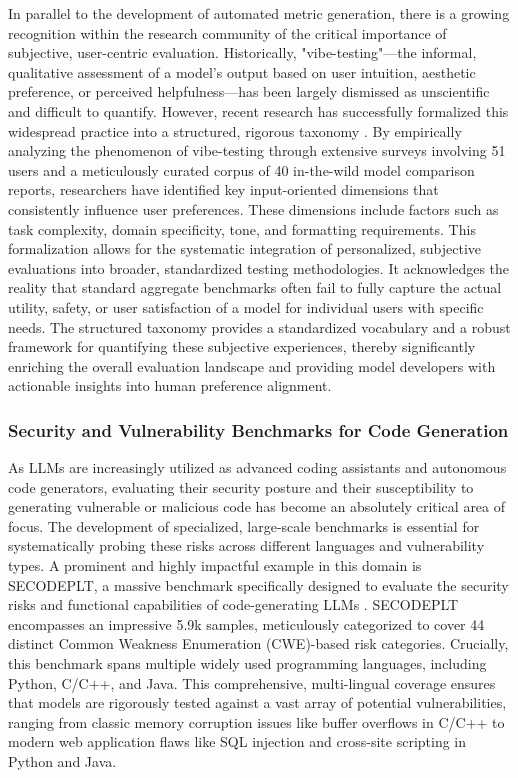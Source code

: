 \documentclass[11pt,a4paper]{article}
\begin{document}
In parallel to the development of automated metric generation, there is a growing recognition within the research community of the critical importance of subjective, user-centric evaluation. Historically, "vibe-testing"---the informal, qualitative assessment of a model's output based on user intuition, aesthetic preference, or perceived helpfulness---has been largely dismissed as unscientific and difficult to quantify. However, recent research has successfully formalized this widespread practice into a structured, rigorous taxonomy \cite{Itzhak_2026_LLMs}. By empirically analyzing the phenomenon of vibe-testing through extensive surveys involving 51 users and a meticulously curated corpus of 40 in-the-wild model comparison reports, researchers have identified key input-oriented dimensions that consistently influence user preferences. These dimensions include factors such as task complexity, domain specificity, tone, and formatting requirements. This formalization allows for the systematic integration of personalized, subjective evaluations into broader, standardized testing methodologies. It acknowledges the reality that standard aggregate benchmarks often fail to fully capture the actual utility, safety, or user satisfaction of a model for individual users with specific needs. The structured taxonomy provides a standardized vocabulary and a robust framework for quantifying these subjective experiences, thereby significantly enriching the overall evaluation landscape and providing model developers with actionable insights into human preference alignment.

\subsubsection{Security and Vulnerability Benchmarks for Code Generation}

As LLMs are increasingly utilized as advanced coding assistants and autonomous code generators, evaluating their security posture and their susceptibility to generating vulnerable or malicious code has become an absolutely critical area of focus. The development of specialized, large-scale benchmarks is essential for systematically probing these risks across different languages and vulnerability types. A prominent and highly impactful example in this domain is SECODEPLT, a massive benchmark specifically designed to evaluate the security risks and functional capabilities of code-generating LLMs \cite{Nie_2024_Secodeplt, Nie_2025_Secodeplt}. SECODEPLT encompasses an impressive 5.9k samples, meticulously categorized to cover 44 distinct Common Weakness Enumeration (CWE)-based risk categories. Crucially, this benchmark spans multiple widely used programming languages, including Python, C/C++, and Java. This comprehensive, multi-lingual coverage ensures that models are rigorously tested against a vast array of potential vulnerabilities, ranging from classic memory corruption issues like buffer overflows in C/C++ to modern web application flaws like SQL injection and cross-site scripting in Python and Java.
\end{document}
